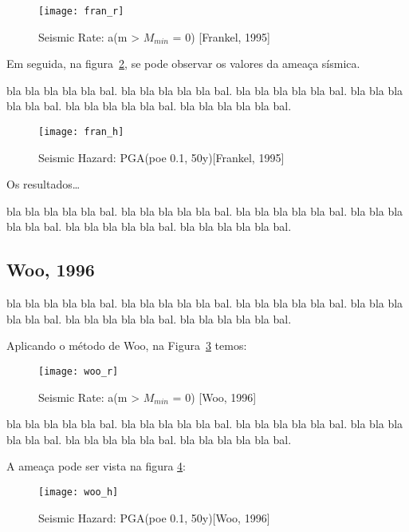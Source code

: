\begin{figure}[!h]
  \centering
  \texttt{[image: fran\_r]} 
  \caption{Seismic Rate: a(m > $M_{min}$ = 0) [Frankel, 1995] }
  \label{fig:fran_r} 
\end{figure}

Em seguida, na figura~\ref{fig:fran_h}, se pode observar os valores da ameaça
sísmica.

bla bla bla bla bla bal.
bla bla bla bla bla bal.
bla bla bla bla bla bal.
bla bla bla bla bla bal.
bla bla bla bla bla bal.
bla bla bla bla bla bal.



\begin{figure}[!h]
  \centering
  \texttt{[image: fran\_h]} 
  \caption{Seismic Hazard: PGA(poe 0.1, 50y)[Frankel, 1995] }
  \label{fig:fran_h} 
\end{figure}


Os resultados\ldots

bla bla bla bla bla bal.
bla bla bla bla bla bal.
bla bla bla bla bla bal.
bla bla bla bla bla bal.
bla bla bla bla bla bal.
bla bla bla bla bla bal.

\subsection{Woo, 1996}
\label{sec:fundamentos}

bla bla bla bla bla bal.
bla bla bla bla bla bal.
bla bla bla bla bla bal.
bla bla bla bla bla bal.
bla bla bla bla bla bal.
bla bla bla bla bla bal.


Aplicando o método de Woo, na Figura~\ref{fig:woo_r} temos:

\begin{figure}[!h]
  \centering
  \texttt{[image: woo\_r]} 
  \caption{Seismic Rate: a(m > $M_{min}$ = 0) [Woo, 1996] }
  \label{fig:woo_r} 
\end{figure}

bla bla bla bla bla bal.
bla bla bla bla bla bal.
bla bla bla bla bla bal.
bla bla bla bla bla bal.
bla bla bla bla bla bal.
bla bla bla bla bla bal.

A ameaça pode ser vista na figura \ref{fig:woo_h}:

\begin{figure}[!h]
  \centering
  \texttt{[image: woo\_h]} 
  \caption{Seismic Hazard: PGA(poe 0.1, 50y)[Woo, 1996] }
  \label{fig:woo_h} 
\end{figure}


